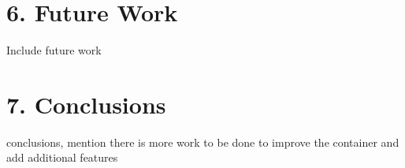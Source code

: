 \documentclass{proc}
\begin{document}
\section*{6. Future Work}

Include future work

\section*{7. Conclusions}

\Include conclusions, mention there is more work to be done to improve the container and add additional features



\end{document}
